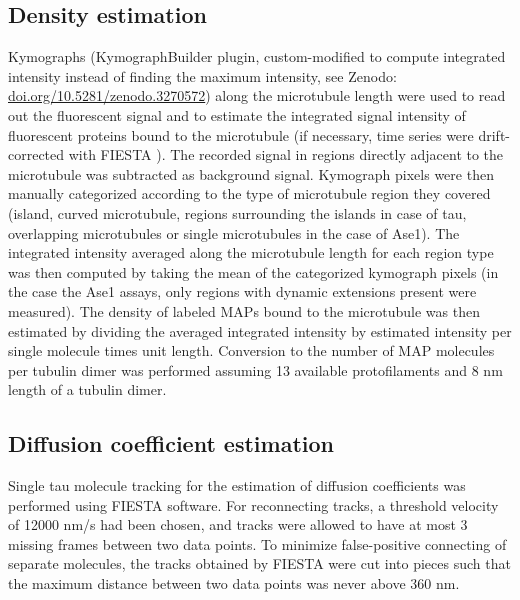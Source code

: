 \subsection{Density estimation}
Kymographs (KymographBuilder plugin, custom-modified to compute integrated intensity instead of finding the maximum intensity, see Zenodo: \url{doi.org/10.5281/zenodo.3270572}) along the microtubule length were used to read out the fluorescent signal and to estimate the integrated signal intensity of fluorescent proteins bound to the microtubule (if necessary, time series were drift-corrected with FIESTA \parencite{RUHNOW20112820}). The recorded signal in regions directly adjacent to the microtubule was subtracted as background signal. Kymograph pixels were then manually categorized according to the type of microtubule region they covered (island, curved microtubule, regions surrounding the islands in case of tau, overlapping microtubules or single microtubules in the case of Ase1). The integrated intensity averaged along the microtubule length for each region type was then computed by taking the mean of the categorized kymograph pixels (in the case the Ase1 assays, only regions with dynamic extensions present were measured). The density of labeled MAPs bound to the microtubule was then estimated by dividing the averaged integrated intensity by estimated intensity per single molecule times unit length. Conversion to the number of MAP molecules per tubulin dimer was performed assuming 13 available protofilaments and 8 nm length of a tubulin dimer.

\subsection{Diffusion coefficient estimation} 
Single tau molecule tracking for the estimation of diffusion coefficients was performed using FIESTA \parencite{RUHNOW20112820} software. For reconnecting tracks, a threshold velocity of 12000 nm/s had been chosen, and tracks were allowed to have at most 3 missing frames between two data points. To minimize false-positive connecting of separate molecules, the tracks obtained by FIESTA were cut into pieces such that the maximum distance between two data points was never above 360 nm.

